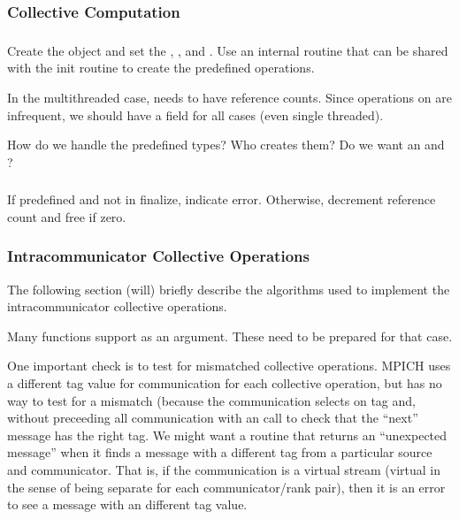 \documentclass{article}
\begin{document}
\subsubsection{Collective Computation}

\subsubsection{}
Create the object and set the ,
, and .  Use an 
internal routine that can be shared with the init routine to create
the predefined operations.

In the multithreaded case,  needs to have reference counts.
Since operations on  are infrequent, we should have a
 field for all cases (even single threaded).

How do we handle the predefined types?  Who creates them?  Do we want an 
 and ?

\subsubsection{}
If predefined and not in finalize, indicate error.
Otherwise, decrement reference count and free if zero.


\subsubsection{Intracommunicator Collective Operations}
The following section (will) briefly describe the algorithms used to implement
the intracommunicator collective operations.

Many functions support  as an argument.  These need to
be prepared for that case.

One important check is to test for mismatched collective operations.
MPICH uses a different tag value for communication for each collective
operation, but has no way to test for a mismatch (because the
communication selects on tag and, without preceeding all communication
with an  call to check that the ``next'' message
has the right tag.  We might want a routine that returns an
``unexpected message'' when it finds a message with a different tag
from a particular source and communicator.
That is, if the communication is a virtual stream (virtual in the
sense of being separate for each communicator/rank pair), then it is
an error to see a message with an different tag value.  
\end{document}
